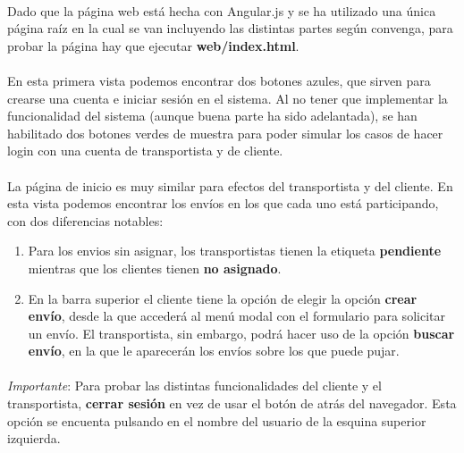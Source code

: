 \documentclass[10pt, a4paper,spanish]{article}
\begin{document}
		\paragraph{}
		Dado que la página web está hecha con Angular.js y se ha utilizado una única página raíz en la cual se van incluyendo las distintas partes según convenga, para probar la página hay que ejecutar \textbf{web/index.html}.

		\paragraph{}
		En esta primera vista podemos encontrar dos botones azules, que sirven para crearse una cuenta e iniciar sesión en el sistema. Al no tener que implementar la funcionalidad del sistema (aunque buena parte ha sido adelantada), se han habilitado dos botones verdes de muestra para poder simular los casos de hacer login con una cuenta de transportista y de cliente.

		\paragraph{}
		La página de inicio es muy similar para efectos del transportista y del cliente. En esta vista podemos encontrar los envíos en los que cada uno está participando, con dos diferencias notables:

		\begin{enumerate}
				\item Para los envios sin asignar, los transportistas tienen la etiqueta \textbf{pendiente} mientras que los clientes tienen \textbf{no asignado}.
				\item En la barra superior el cliente tiene la opción de elegir la opción \textbf{crear envío}, desde la que accederá al menú modal con el formulario para solicitar un envío. El transportista, sin embargo, podrá hacer uso de la opción \textbf{buscar envío}, en la que le aparecerán los envíos sobre los que puede pujar.
		\end{enumerate}

		\paragraph{}
		\textit{Importante}: Para probar las distintas funcionalidades del cliente y el transportista, \textbf{cerrar sesión} en vez de usar el botón de atrás del navegador. Esta opción se encuenta pulsando en el nombre del usuario de la esquina superior izquierda.
\end{document}
